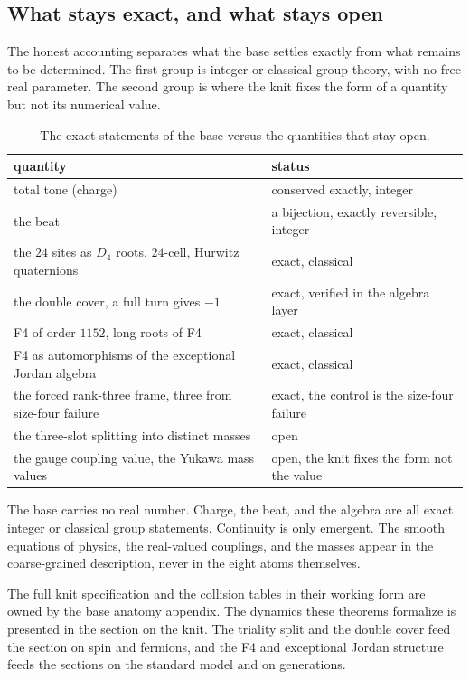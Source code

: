 \subsection{What stays exact, and what stays open}

The honest accounting separates what the base settles exactly from what remains to be determined. The first group is integer or classical group theory, with no free real parameter. The second group is where the knit fixes the form of a quantity but not its numerical value.

\begin{table}[ht]
\centering
\begin{tabular}{@{}ll@{}}
\toprule
quantity & status \\
\midrule
total tone (charge) & conserved exactly, integer \\
the beat & a bijection, exactly reversible, integer \\
the $24$ sites as $D_4$ roots, $24$-cell, Hurwitz quaternions & exact, classical \\
the double cover, a full turn gives $-1$ & exact, verified in the algebra layer \\
F4 of order $1152$, long roots of F4 & exact, classical \\
F4 as automorphisms of the exceptional Jordan algebra & exact, classical \\
the forced rank-three frame, three from size-four failure & exact, the control is the size-four failure \\
the three-slot splitting into distinct masses & open \\
the gauge coupling value, the Yukawa mass values & open, the knit fixes the form not the value \\
\bottomrule
\end{tabular}
\caption{The exact statements of the base versus the quantities that stay open.}
\label{tab:exact-open}
\end{table}

\begin{principle}
The base carries no real number. Charge, the beat, and the algebra are all exact integer or classical group statements. Continuity is only emergent. The smooth equations of physics, the real-valued couplings, and the masses appear in the coarse-grained description, never in the eight atoms themselves.
\end{principle}

The full knit specification and the collision tables in their working form are owned by the base anatomy appendix. The dynamics these theorems formalize is presented in the section on the knit. The triality split and the double cover feed the section on spin and fermions, and the F4 and exceptional Jordan structure feeds the sections on the standard model and on generations.
